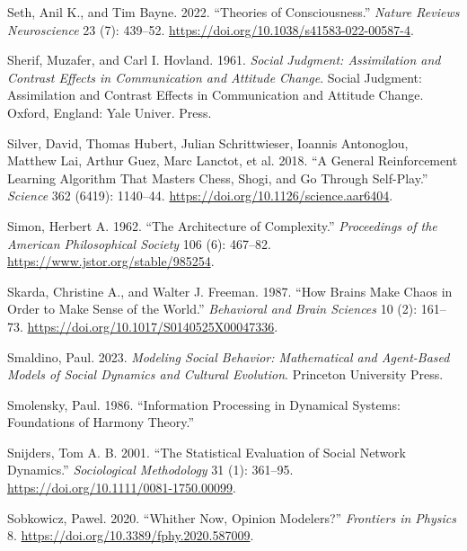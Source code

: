 \documentclass[
  letterpaper,
]{scrbook}
\newlength{\cslhangindent}
\newlength{\cslentryspacingunit} %
\newenvironment{CSLReferences}[2] %
 {%
  \setlength{\parindent}{0pt}
  \ifodd #1
  \let\oldpar\par
  \def\par{\hangindent=\cslhangindent\oldpar}
  \fi
  \setlength{\parskip}{#2\cslentryspacingunit}
 }%
 {}
\begin{document}
\begin{CSLReferences}{1}{0}
\leavevmode{}%
Seth, Anil K., and Tim Bayne. 2022. {``Theories of Consciousness.''}
\emph{Nature Reviews Neuroscience} 23 (7): 439--52.
\url{https://doi.org/10.1038/s41583-022-00587-4}.

\leavevmode{}%
Sherif, Muzafer, and Carl I. Hovland. 1961. \emph{Social Judgment:
{Assimilation} and Contrast Effects in Communication and Attitude
Change}. Social Judgment: {Assimilation} and Contrast Effects in
Communication and Attitude Change. {Oxford, England}: {Yale Univer.
Press}.

\leavevmode{}%
Silver, David, Thomas Hubert, Julian Schrittwieser, Ioannis Antonoglou,
Matthew Lai, Arthur Guez, Marc Lanctot, et al. 2018. {``A General
Reinforcement Learning Algorithm That Masters Chess, Shogi, and {Go}
Through Self-Play.''} \emph{Science} 362 (6419): 1140--44.
\url{https://doi.org/10.1126/science.aar6404}.

\leavevmode{}%
Simon, Herbert A. 1962. {``The {Architecture} of {Complexity}.''}
\emph{Proceedings of the American Philosophical Society} 106 (6):
467--82. \url{https://www.jstor.org/stable/985254}.

\leavevmode{}%
Skarda, Christine A., and Walter J. Freeman. 1987. {``How Brains Make
Chaos in Order to Make Sense of the World.''} \emph{Behavioral and Brain
Sciences} 10 (2): 161--73.
\url{https://doi.org/10.1017/S0140525X00047336}.

\leavevmode{}%
Smaldino, Paul. 2023. \emph{Modeling Social Behavior: Mathematical and
Agent-Based Models of Social Dynamics and Cultural Evolution}. Princeton
University Press.

\leavevmode{}%
Smolensky, Paul. 1986. {``Information {Processing} in {Dynamical
Systems}: {Foundations} of {Harmony Theory}.''}

\leavevmode{}%
Snijders, Tom A. B. 2001. {``The {Statistical Evaluation} of {Social
Network Dynamics}.''} \emph{Sociological Methodology} 31 (1): 361--95.
\url{https://doi.org/10.1111/0081-1750.00099}.

\leavevmode{}%
Sobkowicz, Pawel. 2020. {``Whither {Now}, {Opinion Modelers}?''}
\emph{Frontiers in Physics} 8.
\url{https://doi.org/10.3389/fphy.2020.587009}.


\end{CSLReferences}
\end{document}
